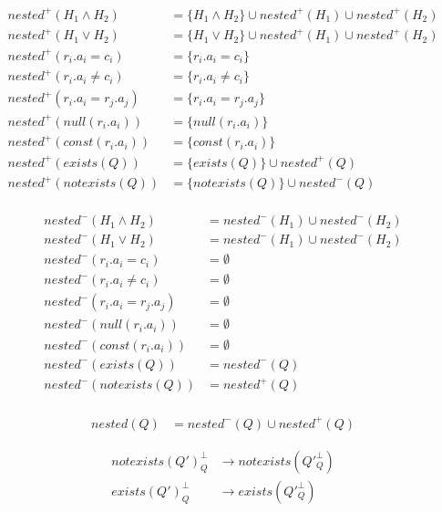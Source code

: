 \begin{mydef}
	
	\begin{align*}
		nested^+(H_1\land H_2) & = \{H_1 \land H_2\}  \cup nested^+(H_1) \cup nested^+(H_2) \\
		nested^+(H_1\lor H_2) & = \{H_1 \lor H_2\}  \cup nested^+(H_1) \cup nested^+(H_2) \\
		nested^+(r_i.a_i = c_i) & = \{r_i.a_i = c_i\} \\
		nested^+(r_i.a_i \neq c_i) & = \{r_i.a_i \neq c_i\} \\
		nested^+(r_i.a_i = r_j.a_j) & = \{r_i.a_i = r_j.a_j\} \\
		nested^+(null(r_i.a_i)) & = \{null(r_i.a_i)\} \\
		nested^+(const(r_i.a_i)) & = \{const(r_i.a_i)\} \\
		nested^+(exists(Q)) & = \{exists(Q)\} \cup nested^+(Q) \\
		nested^+(notexists(Q)) & = \{notexists(Q)\} \cup nested^-(Q) \\
	\end{align*}
	
	\begin{align*}
		nested^-(H_1\land H_2) & =nested^-(H_1) \cup nested^-(H_2) \\
		nested^-(H_1\lor H_2) & =  nested^-(H_1) \cup nested^-(H_2) \\
		nested^-(r_i.a_i = c_i) & = \emptyset \\
		nested^-(r_i.a_i \neq c_i) & = \emptyset \\
		nested^-(r_i.a_i = r_j.a_j) & = \emptyset \\
		nested^-(null(r_i.a_i)) & = \emptyset \\
		nested^-(const(r_i.a_i)) & = \emptyset \\
		nested^-(exists(Q)) & =nested^-(Q) \\
		nested^-(notexists(Q)) & = nested^+(Q) \\
	\end{align*}
	
	\begin{align*}
		nested(Q) & = nested^-(Q) \cup nested^+(Q)
	\end{align*}
\end{mydef}

\begin{mydef}
	\begin{align*}
		notexists(Q')^\bot_Q & \rightarrow notexists(Q'^\bot_Q)
		\\exists(Q')^\bot_Q & \rightarrow exists(Q'^\bot_Q)
	\end{align*}
\end{mydef}

